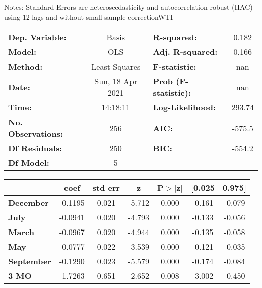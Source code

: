 Notes: \newline
 [1] Standard Errors are heteroscedasticity and autocorrelation robust (HAC) using 12 lags and without small sample correctionWTI\begin{center}
\begin{tabular}{lclc}
\toprule
\textbf{Dep. Variable:}    &      Basis       & \textbf{  R-squared:         } &     0.182   \\
\textbf{Model:}            &       OLS        & \textbf{  Adj. R-squared:    } &     0.166   \\
\textbf{Method:}           &  Least Squares   & \textbf{  F-statistic:       } &       nan   \\
\textbf{Date:}             & Sun, 18 Apr 2021 & \textbf{  Prob (F-statistic):} &      nan    \\
\textbf{Time:}             &     14:18:11     & \textbf{  Log-Likelihood:    } &    293.74   \\
\textbf{No. Observations:} &         256      & \textbf{  AIC:               } &    -575.5   \\
\textbf{Df Residuals:}     &         250      & \textbf{  BIC:               } &    -554.2   \\
\textbf{Df Model:}         &           5      & \textbf{                     } &             \\
\bottomrule
\end{tabular}
\begin{tabular}{lcccccc}
                   & \textbf{coef} & \textbf{std err} & \textbf{z} & \textbf{P$> |$z$|$} & \textbf{[0.025} & \textbf{0.975]}  \\
\midrule
\textbf{December}  &      -0.1195  &        0.021     &    -5.712  &         0.000        &       -0.161    &       -0.079     \\
\textbf{July}      &      -0.0941  &        0.020     &    -4.793  &         0.000        &       -0.133    &       -0.056     \\
\textbf{March}     &      -0.0967  &        0.020     &    -4.944  &         0.000        &       -0.135    &       -0.058     \\
\textbf{May}       &      -0.0777  &        0.022     &    -3.539  &         0.000        &       -0.121    &       -0.035     \\
\textbf{September} &      -0.1290  &        0.023     &    -5.579  &         0.000        &       -0.174    &       -0.084     \\
\textbf{3 MO}      &      -1.7263  &        0.651     &    -2.652  &         0.008        &       -3.002    &       -0.450     \\

\end{tabular}
\end{center}
